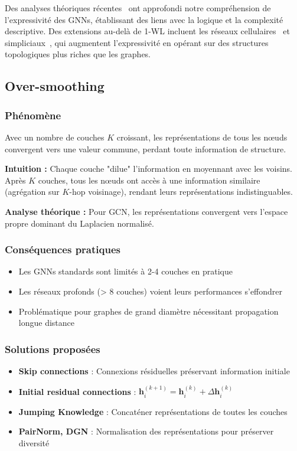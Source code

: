 Des analyses théoriques récentes~\cite{Morris2023WL,Grohe2023,Boker2023} ont approfondi notre compréhension de l'expressivité des GNNs, établissant des liens avec la logique et la complexité descriptive. Des extensions au-delà de 1-WL incluent les réseaux cellulaires~\cite{Bodnar2022CW} et simpliciaux~\cite{Bodnar2021Simplicial}, qui augmentent l'expressivité en opérant sur des structures topologiques plus riches que les graphes.

\subsection{Over-smoothing}

\subsubsection{Phénomène}

Avec un nombre de couches $K$ croissant, les représentations de tous les nœuds convergent vers une valeur commune, perdant toute information de structure.

\textbf{Intuition :}
Chaque couche "dilue" l'information en moyennant avec les voisins. Après $K$ couches, tous les nœuds ont accès à une information similaire (agrégation sur $K$-hop voisinage), rendant leurs représentations indistinguables.

\textbf{Analyse théorique :}
Pour GCN, les représentations convergent vers l'espace propre dominant du Laplacien normalisé.

\subsubsection{Conséquences pratiques}

\begin{itemize}
    \item Les GNNs standards sont limités à 2-4 couches en pratique
    \item Les réseaux profonds (> 8 couches) voient leurs performances s'effondrer
    \item Problématique pour graphes de grand diamètre nécessitant propagation longue distance
\end{itemize}

\subsubsection{Solutions proposées}

\begin{itemize}
    \item \textbf{Skip connections} : Connexions résiduelles préservant information initiale
    \item \textbf{Initial residual connections} : $\mathbf{h}_i^{(k+1)} = \mathbf{h}_i^{(k)} + \Delta\mathbf{h}_i^{(k)}$
    \item \textbf{Jumping Knowledge} : Concaténer représentations de toutes les couches
    \item \textbf{PairNorm, DGN} : Normalisation des représentations pour préserver diversité
\end{itemize}

